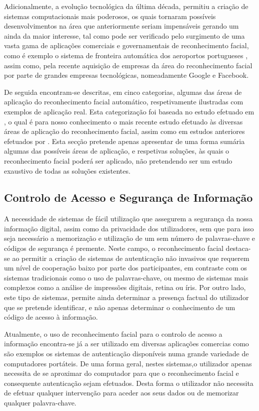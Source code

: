 Adicionalmente, a evolução tecnológica da última década, permitiu a criação de sistemas computacionais mais poderosos, os quais tornaram possíveis desenvolvimentos na área que anteriormente seriam impensáveis gerando um ainda da maior interesse, tal como pode ser verificado pelo surgimento de uma vasta gama de aplicações comerciais e governamentais de reconhecimento facial, como é exemplo o sistema de fronteira automática dos aeroportos portugueses \cite{MinisteriodaAdministracaoInternaa}, assim como, pela recente aquisição de empresas da área do reconhecimento facial por parte de grandes empresas tecnológicas, nomeadamente Google e Facebook.

De seguida encontram-se descritas, em cinco categorias, algumas das áreas de aplicação do reconhecimento facial automático, respetivamente ilustradas com exemplos de aplicação real. Esta categorização foi baseada no estudo efetuado em \cite{Li2011}, o qual é para nosso conhecimento o mais recente estudo efetuado às diversas áreas de aplicação do reconhecimento facial, assim como em estudos anteriores efetuados por \cite{Zhao2003}. Esta secção pretende apenas apresentar de uma forma sumária algumas das possíveis áreas de aplicação, e respetivas soluções, às quais o reconhecimento facial poderá ser aplicado, não pretendendo ser um estudo exaustivo de todas as soluções existentes.

\subsection{Controlo de Acesso e Segurança de Informação} \label{sec:controloAcesso}
A necessidade de sistemas de fácil utilização que assegurem a segurança da nossa informação digital, assim como da privacidade dos utilizadores, sem que para isso seja necessário a memorização e utilização de um sem número de palavras-chave e códigos de segurança é premente. Neste campo, o reconhecimento facial destaca-se ao permitir a criação de sistemas de autenticação não invasivos que requerem um nível de cooperação baixo por parte dos participantes, em contraste com os sistemas tradicionais como o uso de palavras-chave, ou mesmo de sistemas mais complexos como a análise de impressões digitais, retina ou íris. Por outro lado, este tipo de sistemas, permite ainda determinar a presença factual do utilizador que se pretende identificar, e não apenas determinar o conhecimento de um código de acesso à informação.

Atualmente, o uso de reconhecimento facial para o controlo de acesso a informação encontra-se já a ser utilizado em diversas aplicações comercias como são exemplos os sistemas de autenticação disponíveis numa grande variedade de computadores portáteis. De uma forma geral, nestes sistemas,o utilizador apenas necessita de se aproximar do computador para que o reconhecimento facial e consequente autenticação sejam efetuados. Desta forma o utilizador não necessita de efetuar qualquer intervenção para aceder aos seus dados ou de memorizar qualquer palavra-chave.

